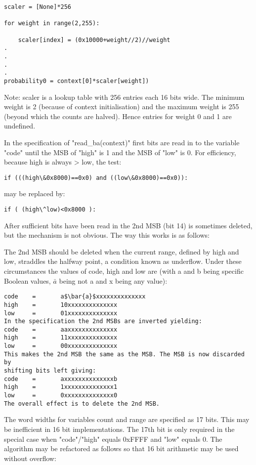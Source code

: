 \begin{informative}
\begin{verbatim}
scaler = [None]*256

for weight in range(2,255):

    scaler[index] = (0x10000+weight//2)//weight
.
.
.
.
probability0 = context[0]*scaler[weight])
\end{verbatim}

Note: scaler is a lookup table with 256 entries each 16 bits wide. The
minimum weight is 2 (because of context initialisation) and the maximum
weight is 255 (beyond which the counts are halved). Hence entries for
weight 0 and 1 are undefined.

In the specification of "read\_ba(context)" first bits are read in to the
variable "code" until the MSB of "high" is 1 and the MSB of "low" is 0.
For efficiency, because high is always > low,  the test:

\begin{verbatim}
if (((high\&0x8000)==0x0) and ((low\&0x8000)==0x0)):
\end{verbatim}

may be replaced by:

\begin{verbatim}
if ( (high\^low)<0x8000 ):
\end{verbatim}

After  sufficient bits have been read in the 2nd MSB (bit 14) is
sometimes deleted, but the mechanism is not obvious. The way this works
is as follows:

The 2nd MSB should be deleted when the current range, defined by high
and low, straddles the halfway point, a condition known as underflow.
Under these circumstances the values of code, high and low are (with a
and b being specific Boolean values, $\bar{a}$ being not a and x being any
value):

\begin{verbatim}
code    =       a$\bar{a}$xxxxxxxxxxxxxx
high    =       10xxxxxxxxxxxxxx
low     =       01xxxxxxxxxxxxxx
In the specification the 2nd MSBs are inverted yielding:
code    =       aaxxxxxxxxxxxxxx
high    =       11xxxxxxxxxxxxxx
low     =       00xxxxxxxxxxxxxx
This makes the 2nd MSB the same as the MSB. The MSB is now discarded by
shifting bits left giving:
code    =       axxxxxxxxxxxxxxb
high    =       1xxxxxxxxxxxxxx1
low     =       0xxxxxxxxxxxxxx0
The overall effect is to delete the 2nd MSB.
\end{verbatim}

The word widths for variables count and range are specified as 17
bits. This may be inefficient in 16 bit implementations. The 17th bit is
only required in the special case when "code"/"high" equals 0xFFFF and
"low" equals 0. The algorithm may be refactored as follows so that 16
bit arithmetic may be used without overflow:



\end{informative}
